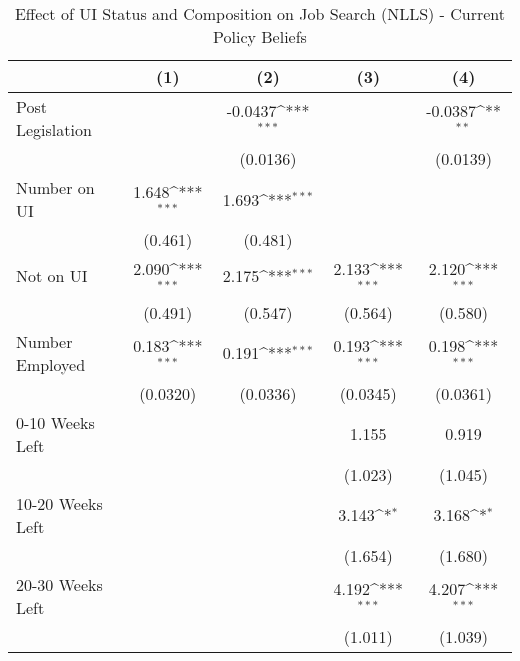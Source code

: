 \begin{table}[htbp]\centering
\small
\def\sym#1{\ifmmode^{#1}\else\(^{#1}\)\fi}
\caption{Effect of UI Status and Composition on Job Search (NLLS) - Current Policy Beliefs \label{tab:naiveregs}}
\begin{tabular}{l*{4}{c}}
\hline\hline
                    &\multicolumn{1}{c}{(1)}         &\multicolumn{1}{c}{(2)}         &\multicolumn{1}{c}{(3)}         &\multicolumn{1}{c}{(4)}         \\
\hline
Post Legislation    &                     &     -0.0437\sym{***}&                     &     -0.0387\sym{**} \\
                    &                     &    (0.0136)         &                     &    (0.0139)         \\
Number on UI        &       1.648\sym{***}&       1.693\sym{***}&                     &                     \\
                    &     (0.461)         &     (0.481)         &                     &                     \\
Not on UI           &       2.090\sym{***}&       2.175\sym{***}&       2.133\sym{***}&       2.120\sym{***}\\
                    &     (0.491)         &     (0.547)         &     (0.564)         &     (0.580)         \\
Number Employed     &       0.183\sym{***}&       0.191\sym{***}&       0.193\sym{***}&       0.198\sym{***}\\
                    &    (0.0320)         &    (0.0336)         &    (0.0345)         &    (0.0361)         \\
0-10 Weeks Left     &                     &                     &       1.155         &       0.919         \\
                    &                     &                     &     (1.023)         &     (1.045)         \\
10-20 Weeks Left    &                     &                     &       3.143\sym{*}  &       3.168\sym{*}  \\
                    &                     &                     &     (1.654)         &     (1.680)         \\
20-30 Weeks Left    &                     &                     &       4.192\sym{***}&       4.207\sym{***}\\
                    &                     &                     &     (1.011)         &     (1.039)         \\

\end{tabular}
\end{table}
